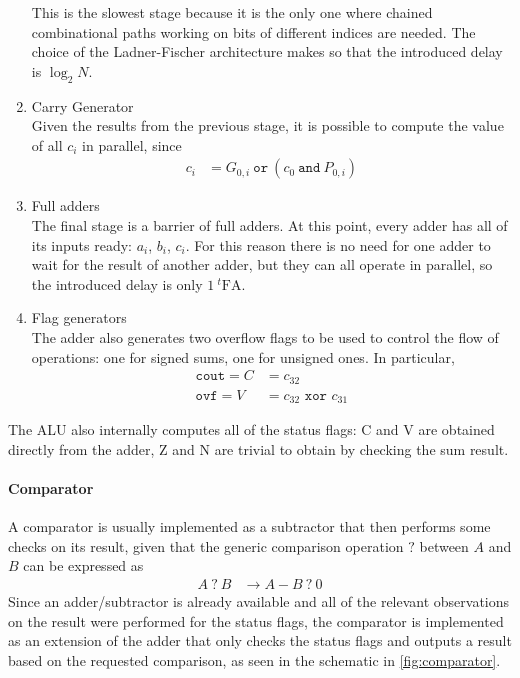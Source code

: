 \begin{enumerate}
    This is the slowest stage because it is the only one where chained combinational paths working on bits of different
    indices are needed. The choice of the Ladner-Fischer architecture makes so that the introduced delay is
    $\log_2{N}$.
    \item Carry Generator \\
    Given the results from the previous stage, it is possible to compute the value of all $c_i$ in parallel, since
    \begin{align*}
        c_i &= G_{0, i}\ \texttt{or}\ (c_0\ \texttt{and}\ P_{0, i})
    \end{align*}

    \item Full adders \\
    The final stage is a barrier of full adders. At this point, every adder has all of its inputs ready: $a_i$, $b_i$,
    $c_i$. For this reason there is no need for one adder to wait for the result of another adder, but they can all
    operate in parallel, so the introduced delay is only $1\ ^t\text{FA}$.

    \item Flag generators \\
    The adder also generates two overflow flags to be used to control the flow of operations: one for signed sums, one
    for unsigned ones. In particular,
    \begin{align*}
        \texttt{cout} = C &= c_{32} \\
        \texttt{ovf} = V &= c_{32} \texttt{ xor } c_{31}
    \end{align*}
\end{enumerate}
The ALU also internally computes all of the status flags: C and V are obtained directly from the adder, Z and N are
trivial to obtain by checking the sum result.

\paragraph{Comparator}
A comparator is usually implemented as a subtractor that then performs some checks on its result, given that the generic
comparison operation $?$ between $A$ and $B$ can be expressed as
\begin{align}
    A\ ?\ B &\rightarrow A - B\ ?\ 0
\end{align}
Since an adder/subtractor is already available and all of the relevant observations on the result were performed for
the status flags, the comparator is implemented as an extension of the adder that only checks the status flags and
outputs a result based on the requested comparison, as seen in the schematic in \autoref{fig:comparator}.

